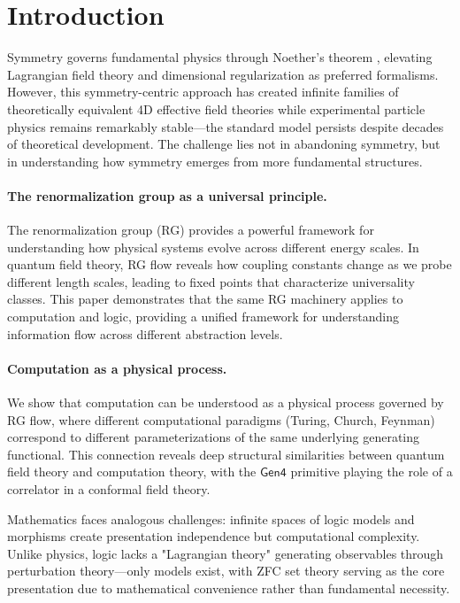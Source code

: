 \section{Introduction}
\label{sec:introduction}

Symmetry governs fundamental physics through Noether's theorem \cite{noether1918}, elevating Lagrangian field theory and dimensional regularization as preferred formalisms. However, this symmetry-centric approach has created infinite families of theoretically equivalent 4D effective field theories while experimental particle physics remains remarkably stable—the standard model persists despite decades of theoretical development. The challenge lies not in abandoning symmetry, but in understanding how symmetry emerges from more fundamental structures.


\paragraph{The renormalization group as a universal principle.} The renormalization group (RG) provides a powerful framework for understanding how physical systems evolve across different energy scales. In quantum field theory, RG flow reveals how coupling constants change as we probe different length scales, leading to fixed points that characterize universality classes. This paper demonstrates that the same RG machinery applies to computation and logic, providing a unified framework for understanding information flow across different abstraction levels.

\paragraph{Computation as a physical process.} We show that computation can be understood as a physical process governed by RG flow, where different computational paradigms (Turing, Church, Feynman) correspond to different parameterizations of the same underlying generating functional. This connection reveals deep structural similarities between quantum field theory and computation theory, with the $\mathsf{Gen4}$ primitive playing the role of a correlator in a conformal field theory. 

Mathematics faces analogous challenges: infinite spaces of logic models and morphisms create presentation independence but computational complexity. Unlike physics, logic lacks a "Lagrangian theory" generating observables through perturbation theory—only models exist, with ZFC set theory serving as the core presentation due to mathematical convenience rather than fundamental necessity. 




